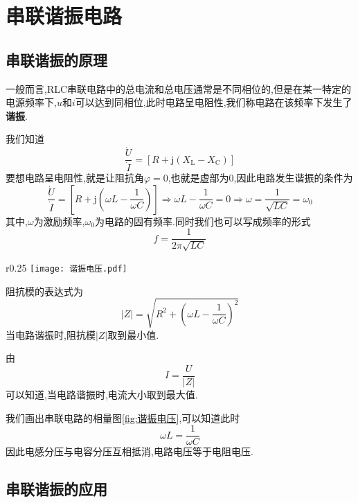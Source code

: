 \section{\K 串联谐振电路}
\subsection{\K 串联谐振的原理}
\Par 一般而言,RLC串联电路中的总电流和总电压通常是不同相位的,但是在某一特定的电源频率下,$u$和$i$可以达到同相位,此时电路呈电阻性,我们称电路在该频率下发生了\textbf{谐振}.

\Par 我们知道
\begin{equation*}
    \frac{\dot{U}}{\dot{I}}=\left[ R+\mathrm{j}\left( X_{\mathrm{L}}-X_{\mathrm{C}} \right) \right] 
\end{equation*}
要想电路呈电阻性,就是让阻抗角$\varphi =0$,也就是虚部为0,因此电路发生谐振的条件为
\begin{equation}
    \frac{\dot{U}}{\dot{I}}=\left[ R+\mathrm{j}\left( \omega L-\frac{1}{\omega C} \right) \right] \Rightarrow \omega L-\frac{1}{\omega C}=0\Rightarrow \omega =\frac{1}{\sqrt{LC}}=\omega _0
\end{equation}
其中,$\omega$为激励频率,$\omega _0$为电路的固有频率.同时我们也可以写成频率的形式
\begin{equation}
    f=\frac{1}{2\pi \sqrt{LC}}
\end{equation}

\begin{wrapfigure}{r}{0.25\textwidth}
    \centering
    \texttt{[image: 谐振电压.pdf]}
    \caption{谐振电压}
    \label{fig:谐振电压}
\end{wrapfigure}
\Par 阻抗模的表达式为
\begin{equation}
    \left| Z \right|=\sqrt{R^2+\left( \omega L-\frac{1}{\omega C} \right) ^2}
\end{equation}
当电路谐振时,阻抗模$\left| Z \right|$取到最小值.

\Par 由
\begin{equation}
    I=\frac{U}{\left| Z \right|}
\end{equation}
可以知道,当电路谐振时,电流大小取到最大值.

\Par 我们画出串联电路的相量图\ref{fig:谐振电压},可以知道此时
\begin{equation*}
    \omega L=\frac{1}{\omega C}
\end{equation*}
因此电感分压与电容分压互相抵消,电路电压等于电阻电压.

\subsection{\K 串联谐振的应用}

